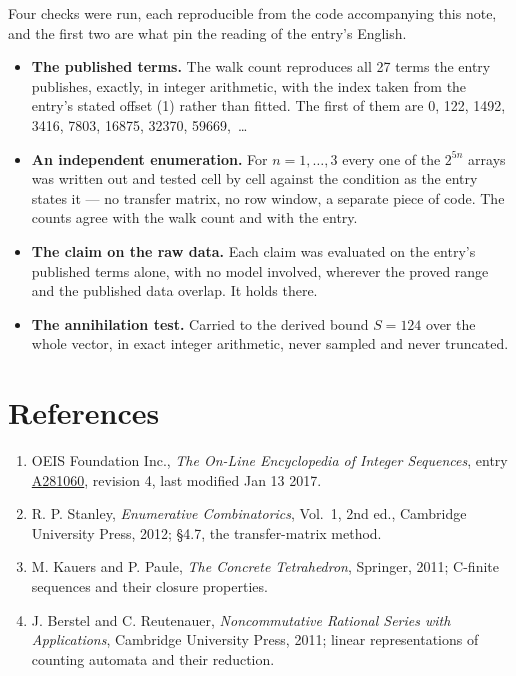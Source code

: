 \documentclass[11pt]{article}
\theoremstyle{definition}
\begin{document}
Four checks were run, each reproducible from the code accompanying this note, and the first two are what pin the reading of the entry's English.

\begin{itemize}

\item {\bfseries The published terms.} The walk count reproduces all 27 terms the entry publishes, exactly, in integer arithmetic, with the index taken from the entry's stated offset (1) rather than fitted. The first of them are 0, 122, 1492, 3416, 7803, 16875, 32370, 59669,~\dots

\item {\bfseries An independent enumeration.} For $n = 1,\dots,3$ every one of the $2^{5n}$ arrays was written out and tested cell by cell against the condition as the entry states it --- no transfer matrix, no row window, a separate piece of code. The counts agree with the walk count and with the entry.

\item {\bfseries The claim on the raw data.} Each claim was evaluated on the entry's published terms alone, with no model involved, wherever the proved range and the published data overlap. It holds there.

\item {\bfseries The annihilation test.} Carried to the derived bound $S = 124$ over the whole vector, in exact integer arithmetic, never sampled and never truncated.

\end{itemize}

\section{References}

\begin{enumerate}

\item OEIS Foundation Inc., \emph{The On-Line Encyclopedia of Integer Sequences}, entry \href{https://oeis.org/A281060}{A281060}, revision 4, last modified Jan 13 2017.

\item R. P. Stanley, \emph{Enumerative Combinatorics}, Vol.~1, 2nd ed., Cambridge University Press, 2012; \S4.7, the transfer-matrix method.

\item M. Kauers and P. Paule, \emph{The Concrete Tetrahedron}, Springer, 2011; C-finite sequences and their closure properties.

\item J. Berstel and C. Reutenauer, \emph{Noncommutative Rational Series with Applications}, Cambridge University Press, 2011; linear representations of counting automata and their reduction.

\end{enumerate}
\end{document}
